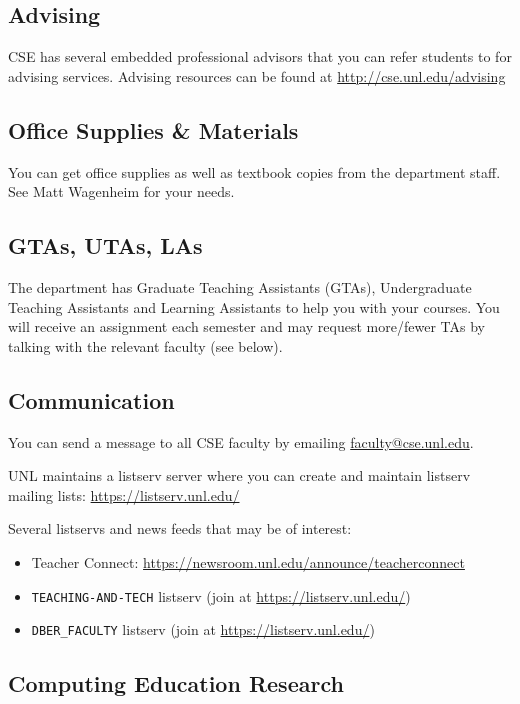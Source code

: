 \documentclass[12pt]{scrartcl}
\begin{document}
\subsection{Advising}

CSE has several embedded professional advisors that you can
refer students to for advising services.  Advising resources
can be found at \url{http://cse.unl.edu/advising} 

\subsection{Office Supplies \& Materials}

You can get office supplies as well as textbook copies from the
department staff.  See Matt Wagenheim for your needs.

\subsection{GTAs, UTAs, LAs}

The department has Graduate Teaching Assistants (GTAs), 
Undergraduate Teaching Assistants and Learning Assistants
to help you with your courses.  You will receive an assignment
each semester and may request more/fewer TAs by talking
with the relevant faculty (see below).

\subsection{Communication}

You can send a message to all CSE faculty by emailing 
\href{mailto:faculty@cse.unl.edu}{faculty@cse.unl.edu}. 

UNL maintains a listserv server where you can create and
maintain listserv mailing lists: \url{https://listserv.unl.edu/}

Several listservs and news feeds that may be of interest:
\begin{itemize}
  \item Teacher Connect: \url{https://newsroom.unl.edu/announce/teacherconnect}
  \item \texttt{TEACHING-AND-TECH} listserv (join at \url{https://listserv.unl.edu/})
  \item \texttt{DBER_FACULTY} listserv (join at \url{https://listserv.unl.edu/})
\end{itemize}

\subsection{Computing Education Research}
\end{document}

